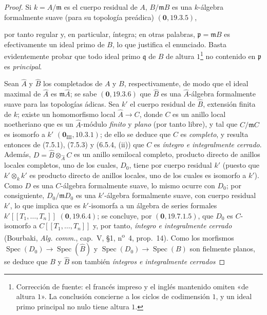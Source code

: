 \begin{proof}
Si $k=A/\mathfrak m$ es el cuerpo residual de $A$, $B/\mathfrak mB$ es una
$k$-álgebra formalmente suave (para 
su topología preádica) $(\mathbf 0, 19.3.5)$,

por tanto regular y, en particular, íntegra; en otras palabras,
$\mathfrak p=\mathfrak mB$ es efectivamente un ideal primo de $B$, lo que justifica
el enunciado. Basta evidentemente probar que todo ideal primo $\mathfrak q$ de $B$ de altura $1$\footnote{Corrección de fuente: el francés impreso y el inglés mantenido omiten «de altura $1$». La conclusión concierne a los ciclos de codimensión $1$, y un ideal primo principal no nulo tiene altura $1$.} no contenido en $\mathfrak p$ es \emph{principal}.

Sean $\widehat A$ y $\widehat B$ los completados de $A$ y $B$, respectivamente, de
modo que el ideal maximal de $\widehat A$ es $\mathfrak m\widehat A$; se sabe
$(\mathbf 0, 19.3.6)$ que $\widehat B$ es una $\widehat A$-álgebra formalmente
suave para las topologías ádicas. Sea $k'$ el cuerpo residual de $\widehat B$,
extensión finita de $k$; existe un homomorfismo local $\widehat A\to C$, donde $C$
es un anillo local noetheriano que es un $\widehat A$-módulo \emph{finito} y
\emph{plano} (por tanto libre), y tal que $C/\mathfrak mC$ es isomorfo a $k'$
$(\mathbf 0_{\mathrm{III}}, 10.3.1)$; de ello se deduce que $C$ es \emph{completo}, y
resulta entonces de (7.5.1), (7.5.3) y (6.5.4, (ii)) que $C$ es \emph{íntegro e
integralmente cerrado}. Además,
$D=\widehat B\otimes_{\widehat A}C$
es un anillo semilocal completo, producto directo de anillos locales completos, uno de los cuales,
$D_0$, tiene por cuerpo residual $k'$ (puesto que $k'\otimes_k k'$ es producto directo
de anillos locales, uno de los cuales es isomorfo a $k'$). Como $D$ es una $C$-álgebra formalmente suave,
lo mismo ocurre con $D_0$; por consiguiente, $D_0/\mathfrak mD_0$ es una
$k'$-álgebra formalmente suave, con cuerpo residual $k'$, lo que implica que es
$k'$-isomorfa a un álgebra de series formales
$k'[[T_1,\ldots,T_n]]$ $(\mathbf 0, 19.6.4)$; se concluye, por
$(\mathbf 0, 19.7.1.5)$, que $D_0$ es $C$-isomorfo a
$C[[T_1,\ldots,T_n]]$ y, por tanto, \emph{íntegro e integralmente cerrado} (Bourbaki,
\emph{Alg. comm.}, cap.~V, \S1, n\textsuperscript{o}~4, prop.~14). Como los
morfismos $\operatorname{Spec}(D_0)\to\operatorname{Spec}(\widehat B)$ y
$\operatorname{Spec}(D_0)\to\operatorname{Spec}(B)$ son fielmente planos, se
deduce que $B$ y $\widehat B$ son también \emph{íntegros e integralmente cerrados}

\end{proof}
